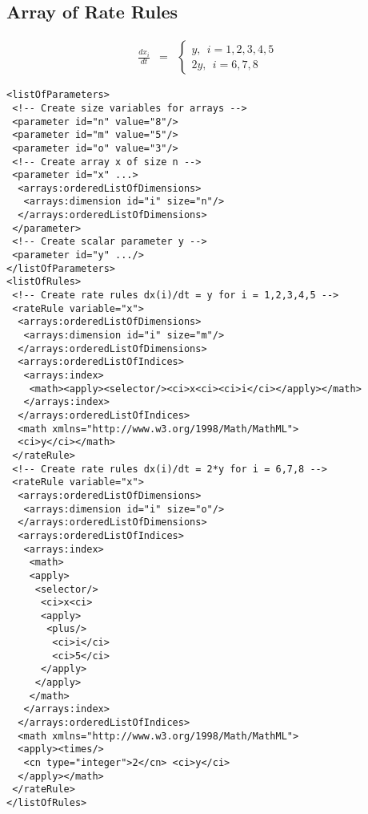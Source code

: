 

\subsection{Array of Rate Rules}

\begin{eqnarray*}
\frac{dx_i}{dt} & = & \left\{ \begin{array}{l}
  y,~~i = 1,2,3,4,5 \\
 2y,~~i = 6, 7, 8 
\end{array}
\right.
\end{eqnarray*}
\begin{verbatim}
<listOfParameters>
 <!-- Create size variables for arrays -->
 <parameter id="n" value="8"/>
 <parameter id="m" value="5"/>
 <parameter id="o" value="3"/>
 <!-- Create array x of size n -->
 <parameter id="x" ...> 
  <arrays:orderedListOfDimensions>
   <arrays:dimension id="i" size="n"/>
  </arrays:orderedListOfDimensions>
 </parameter>
 <!-- Create scalar parameter y -->
 <parameter id="y" .../>
</listOfParameters>
<listOfRules>
 <!-- Create rate rules dx(i)/dt = y for i = 1,2,3,4,5 -->
 <rateRule variable="x">
  <arrays:orderedListOfDimensions>
   <arrays:dimension id="i" size="m"/>
  </arrays:orderedListOfDimensions>
  <arrays:orderedListOfIndices>
   <arrays:index>
    <math><apply><selector/><ci>x<ci><ci>i</ci></apply></math>
   </arrays:index>
  </arrays:orderedListOfIndices>
  <math xmlns="http://www.w3.org/1998/Math/MathML">
  <ci>y</ci></math>
 </rateRule>
 <!-- Create rate rules dx(i)/dt = 2*y for i = 6,7,8 -->
 <rateRule variable="x">
  <arrays:orderedListOfDimensions>
   <arrays:dimension id="i" size="o"/>
  </arrays:orderedListOfDimensions>
  <arrays:orderedListOfIndices>
   <arrays:index>
    <math>
    <apply>
     <selector/>
      <ci>x<ci>
      <apply>
       <plus/>
        <ci>i</ci>
        <ci>5</ci>
      </apply>
     </apply>
    </math>
   </arrays:index>
  </arrays:orderedListOfIndices>
  <math xmlns="http://www.w3.org/1998/Math/MathML">
  <apply><times/>
   <cn type="integer">2</cn> <ci>y</ci>
  </apply></math> 
 </rateRule>
</listOfRules>
\end{verbatim}

